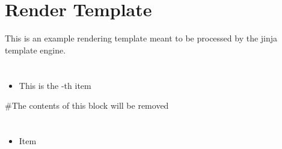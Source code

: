 \documentclass{article}
\begin{document}
    \section{Render Template}
    This is an example rendering template meant to be processed by the jinja template engine.

    \section{}
    \begin{itemize}
        \item This is the -th item

    \end{itemize}

    \#{The contents of this block will be removed}

    \section{}
    \begin{itemize}
        \item Item 
    \end{itemize}
\end{document}
